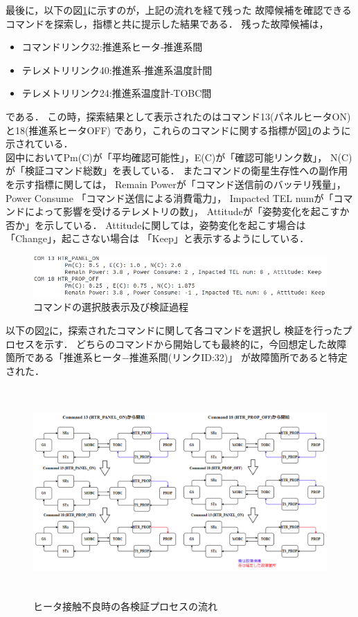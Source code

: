 \documentclass[11pt]{jsreport}
\begin{document}
最後に，以下の図\ref{fig:COM_candidate}に示すのが，上記の流れを経て残った
故障候補を確認できるコマンドを探索し，指標と共に提示した結果である．
残った故障候補は，
\begin{itemize}
   \item コマンドリンク32:推進系ヒータ‐推進系間
   \item テレメトリリンク40:推進系‐推進系温度計間
   \item テレメトリリンク24:推進系温度計‐TOBC間   
\end{itemize}
である．
この時，探索結果として表示されたのはコマンド13(パネルヒータON)と18(推進系ヒータOFF)
であり，これらのコマンドに関する指標が図\ref{fig:COM_candidate}のように示されている．\\
図中においてPm(C)が「平均確認可能性」，E(C)が「確認可能リンク数」，
N(C)が「検証コマンド総数」を表している．
またコマンドの衛星生存性への副作用を示す指標に関しては，
Remain Powerが「コマンド送信前のバッテリ残量」，Power Consume
「コマンド送信による消費電力」，
Impacted TEL numが「コマンドによって影響を受けるテレメトリの数」，
Attitudeが「姿勢変化を起こすか否か」を示している．
Attitudeに関しては，姿勢変化を起こす場合は「Change」，起こさない場合は
「Keep」と表示するようにしている．

\begin{figure}[H]
   \centering
      \includegraphics[width=15.0cm]{figure/COM_candidate.png}
      \caption{コマンドの選択肢表示及び検証過程}
      \label{fig:COM_candidate}
\end{figure}
以下の図\ref{fig:COM_process_HTR_fault}に，探索されたコマンドに関して各コマンドを選択し
検証を行ったプロセスを示す．
どちらのコマンドから開始しても最終的に，今回想定した故障箇所である「推進系ヒータ−推進系間(リンクID:32)」
が故障箇所であると特定された．

\begin{figure}[H]
   \centering
      \includegraphics[height=8.0cm]{figure/COM_process_HTR_PROP_fault.png}
      \caption{ヒータ接触不良時の各検証プロセスの流れ}
      \label{fig:COM_process_HTR_fault}
\end{figure}
\end{document}
